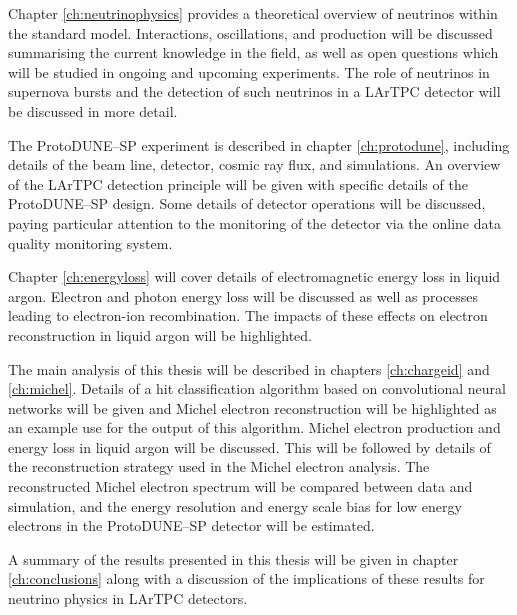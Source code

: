 Chapter \ref{ch:neutrinophysics} provides a theoretical overview of neutrinos
within the standard model. Interactions, oscillations, and production will be
discussed summarising the current knowledge in the field, as well as open
questions which will be studied in ongoing and upcoming experiments. The role of
neutrinos in supernova bursts and the detection of such neutrinos in a LArTPC
detector will be discussed in more detail.

The ProtoDUNE--SP experiment is described in chapter \ref{ch:protodune},
including details of the beam line, detector, cosmic ray flux, and simulations.
An overview of the LArTPC detection principle will be given with specific
details of the ProtoDUNE--SP design. Some details of detector operations will be
discussed, paying particular attention to the monitoring of the detector via the
online data quality monitoring system.

Chapter \ref{ch:energyloss} will cover details of electromagnetic energy loss
in liquid argon. Electron and photon energy loss will be discussed as well as
processes leading to electron-ion recombination. The impacts of these effects on
electron reconstruction in liquid argon will be highlighted.

The main analysis of this thesis will be described in chapters
\ref{ch:chargeid} and \ref{ch:michel}. Details of a hit classification
algorithm based on convolutional neural networks will be given and Michel
electron reconstruction will be highlighted as an example use for the output of
this algorithm. Michel electron production and energy loss in liquid argon will
be discussed. This will be followed by details of the reconstruction strategy
used in the Michel electron analysis. The reconstructed Michel electron spectrum
will be compared between data and simulation, and the energy resolution and
energy scale bias for low energy electrons in the ProtoDUNE--SP detector will be
estimated. 

A summary of the results presented in this thesis will be given in chapter
\ref{ch:conclusions} along with a discussion of the implications of these
results for neutrino physics in LArTPC detectors.
